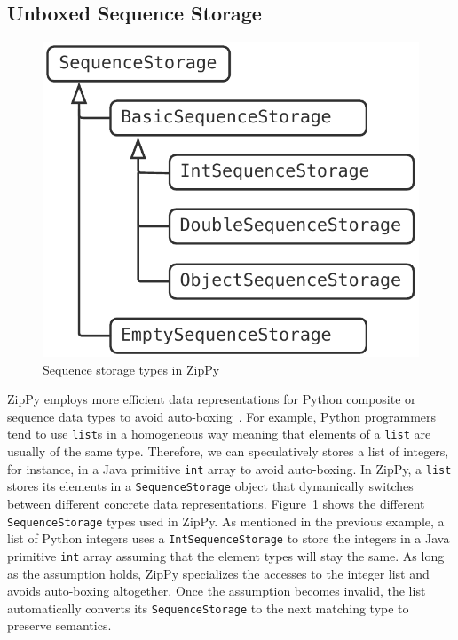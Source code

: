 \subsection{Unboxed Sequence Storage}

\begin{figure}[ht]
\centering
\includegraphics[scale=.5]{figures/ch3-sequence-storage-types.pdf}
\caption{Sequence storage types in ZipPy}
\label{fig:sequence-storage-types}
\end{figure}

ZipPy employs more efficient data representations for Python composite or sequence data types to avoid auto-boxing~\cite{Bolz+2013}.
For example, Python programmers tend to use \texttt{list}s in a homogeneous way meaning that elements of a \texttt{list} are usually of the same type.
Therefore, we can speculatively stores a list of integers, for instance, in a Java primitive \texttt{int} array to avoid auto-boxing.
In ZipPy, a \texttt{list} stores its elements in a \texttt{SequenceStorage} object that dynamically switches between different concrete data representations.
Figure~\ref{fig:sequence-storage-types} shows the different \texttt{SequenceStorage} types used in ZipPy.
As mentioned in the previous example, a list of Python integers uses a \texttt{IntSequenceStorage} to store the integers in a Java primitive \texttt{int} array assuming that the element types will stay the same.
As long as the assumption holds, ZipPy specializes the accesses to the integer list and avoids auto-boxing altogether.
Once the assumption becomes invalid, the list automatically converts its \texttt{SequenceStorage} to the next matching type to preserve semantics.

